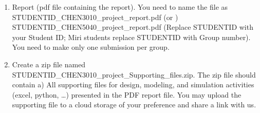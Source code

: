 \documentclass[
  12pt,
  a4paperpaper,
  DIV=11,
  numbers=noendperiod]{scrartcl}
\begin{document}
\begin{enumerate}
\def\labelenumi{\arabic{enumi}.}
\item
  Report (pdf file containing the report). You need to name the file as
  STUDENTID\_CHEN3010\_project\_report.pdf (or )
  STUDENTID\_CHEN5040\_project\_report.pdf (Replace STUDENTID with your
  Student ID; Miri students replace STUDENTID with Group number). You
  need to make only one submission per group.
\item
  Create a zip file named
  STUDENTID\_CHEN3010\_project\_Supporting\_files.zip. The zip file
  should contain a) All supporting files for design, modeling, and
  simulation activities (excel, python, \ldots) presented in the PDF
  report file. You may upload the supporting file to a cloud storage of
  your preference and share a link with us.
\end{enumerate}

\newpage{}
\end{document}
